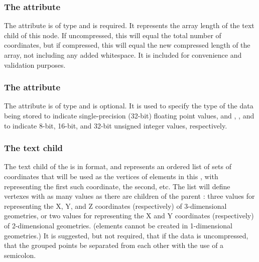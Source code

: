 
\subsubsection{The \fixttspace{} attribute}
The  attribute is of type  and is required. It represents the array length of the  text child of this node.  If uncompressed, this will equal the total number of coordinates, but if compressed, this will equal the new compressed length of the array, not including any added whitespace.  It is included for convenience and validation purposes.


\subsubsection{The \fixttspace{} attribute}
The  attribute is of type  and is optional.  It is used to specify the type of the data being stored  to indicate single-precision (32-bit) floating point values, and , , and  to indicate 8-bit, 16-bit, and 32-bit unsigned integer values, respectively.

\subsubsection{The \fixttspace{} text child}
\label{arraydata-class}
The  text child of the \SpatialPoints is in  format, and represents an ordered list of sets of coordinates that will be used as the vertices of \ParametricObject elements in this \ParametricGeometry, with  representing the first such coordinate,  the second, etc.  The list will define vertexes with as many values as there are \CoordinateComponent children of the parent \Geometry:  three values for representing the X, Y, and Z coordinates (respectively) of 3-dimensional geometries, or two values for representing the X and Y coordinates (respectively) of 2-dimensional geometries.  (\ParametricGeometry elements cannot be created in 1-dimensional geometries.)  It is suggested, but not required, that if the data is uncompressed, that the grouped points be separated from each other with the use of a semicolon.

